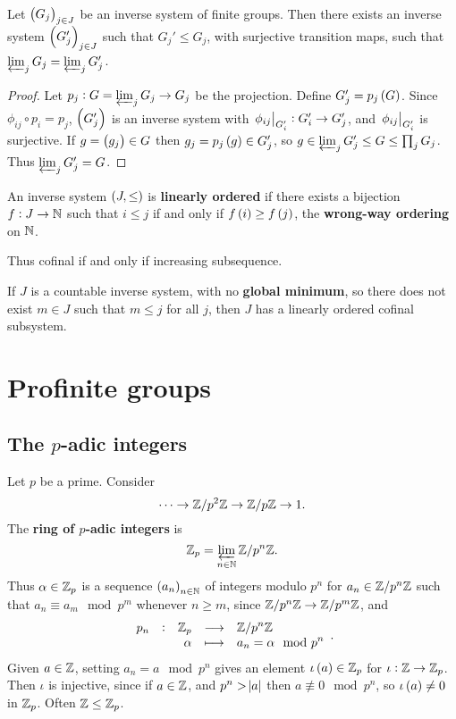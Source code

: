 \begin{proposition}
\label{prop:1.3.7}
Let $ \br{G_j}_{j \in J} $ be an inverse system of finite groups. Then there exists an inverse system $ \br{G_j'}_{j \in J} $ such that $ G_j' \le G_j $, with surjective transition maps, such that $ \varprojlim_j G_j = \varprojlim_j G_j' $.
\end{proposition}

\begin{proof}
Let $ p_j : G = \varprojlim_j G_j \to G_j $ be the projection. Define $ G_j' = p_j\br{G} $. Since $ \phi_{ij} \circ p_i = p_j $, $ \br{G_j'} $ is an inverse system with $ \left. \phi_{ij} \right|_{G_i'} : G_i' \to G_j' $, and $ \left. \phi_{ij} \right|_{G_i'} $ is surjective. If $ g = \br{g_j} \in G $ then $ g_j = p_j\br{g} \in G_j' $, so $ g \in \varprojlim_j G_j' \le G \le \prod_j G_j $. Thus $ \varprojlim_j G_j' = G $.
\end{proof}

\begin{definition}
An inverse system $ \br{J, \le} $ is \textbf{linearly ordered} if there exists a bijection $ f : J \to \mathbb{N} $ such that $ i \le j $ if and only if $ f\br{i} \ge f\br{j} $, the \textbf{wrong-way ordering} on $ \mathbb{N} $.
\end{definition}

Thus cofinal if and only if increasing subsequence.

\begin{proposition}
\label{prop:1.3.11}
If $ J $ is a countable inverse system, with no \textbf{global minimum}, so there does not exist $ m \in J $ such that $ m \le j $ for all $ j $, then $ J $ has a linearly ordered cofinal subsystem.
\end{proposition}

\pagebreak

\section{Profinite groups}

\subsection{The \texorpdfstring{$ p $}{p}-adic integers}


Let $ p $ be a prime. Consider
$$ \dots \to \mathbb{Z} / p^2\mathbb{Z} \to \mathbb{Z} / p\mathbb{Z} \to 1. $$
The \textbf{ring of $ p $-adic integers} is
$$ \mathbb{Z}_p = \varprojlim_{n \in \mathbb{N}} \mathbb{Z} / p^n\mathbb{Z}. $$
Thus $ \alpha \in \mathbb{Z}_p $ is a sequence $ \br{a_n}_{n \in \NN} $ of integers modulo $ p^n $ for $ a_n \in \mathbb{Z} / p^n\mathbb{Z} $ such that $ a_n \equiv a_m \mod p^m $ whenever $ n \ge m $, since $ \mathbb{Z} / p^n\mathbb{Z} \to \mathbb{Z} / p^m\mathbb{Z} $, and
$$ \function[p_n]{\ZZ_p}{\ZZ / p^n\ZZ}{\alpha}{a_n = \alpha \mod p^n}. $$
Given $ a \in \mathbb{Z} $, setting $ a_n = a \mod p^n $ gives an element $ \iota\br{a} \in \ZZ_p $ for $ \iota : \mathbb{Z} \to \mathbb{Z}_p $. Then $ \iota $ is injective, since if $ a \in \mathbb{Z} $, and $ p^n > \abs{a} $ then $ a \not\equiv 0 \mod p^n $, so $ \iota\br{a} \ne 0 $ in $ \mathbb{Z}_p $. Often $ \mathbb{Z} \le \mathbb{Z}_p $.

